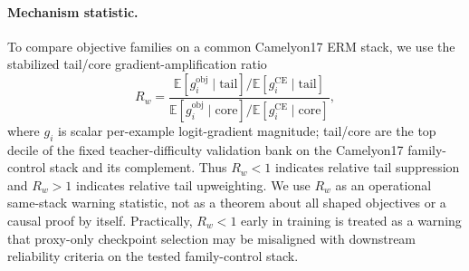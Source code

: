 \paragraph{Mechanism statistic.}
To compare objective families on a common Camelyon17 ERM stack, we use the stabilized tail/core gradient-amplification ratio
\begin{equation}
R_w =
\frac{\mathbb{E}[g_i^{\mathrm{obj}}\mid \mathrm{tail}] / \mathbb{E}[g_i^{\mathrm{CE}}\mid \mathrm{tail}]}
{\mathbb{E}[g_i^{\mathrm{obj}}\mid \mathrm{core}] / \mathbb{E}[g_i^{\mathrm{CE}}\mid \mathrm{core}]},
\end{equation}
where $g_i$ is scalar per-example logit-gradient magnitude; tail/core are the top decile of the fixed teacher-difficulty validation bank on the Camelyon17 family-control stack and its complement.
Thus $R_w<1$ indicates relative tail suppression and $R_w>1$ indicates relative tail upweighting.
We use $R_w$ as an operational same-stack warning statistic, not as a theorem about all shaped objectives or a causal proof by itself.
Practically, $R_w<1$ early in training is treated as a warning that proxy-only checkpoint selection may be misaligned with downstream reliability criteria on the tested family-control stack.
